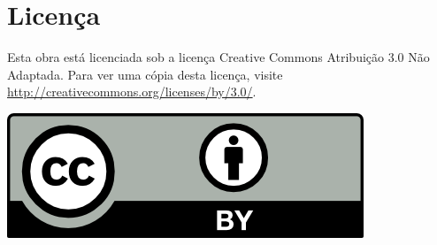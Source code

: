 \section{Licença}
Esta obra está licenciada sob a licença Creative Commons Atribuição 3.0 Não
Adaptada. Para ver uma cópia desta licença, visite
\url{http://creativecommons.org/licenses/by/3.0/}.
\begin{center}
    \includegraphics{../../figures/cc-by.png}
\end{center}
